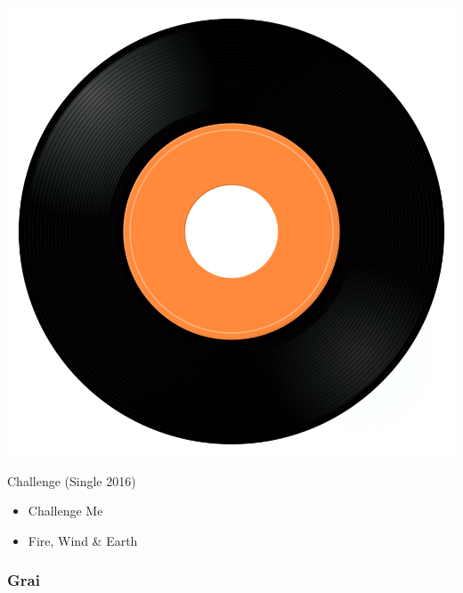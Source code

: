 \begin{minipage}[t]{0.25\textwidth}
\captionsetup{type=figure}
\includegraphics[width=\textwidth]{Images/cover.png}
\caption*{Challenge (Single 2016)}
\end{minipage}
\begin{minipage}[t]{0.25\textwidth}\vspace{0pt}
\begin{itemize}[nosep,leftmargin=1em,labelwidth=*,align=left]
	\setlength{\itemsep}{0pt}
	\item Challenge Me
	\item Fire, Wind \& Earth
\end{itemize}
\end{minipage}

\subsubsection{Grai}

